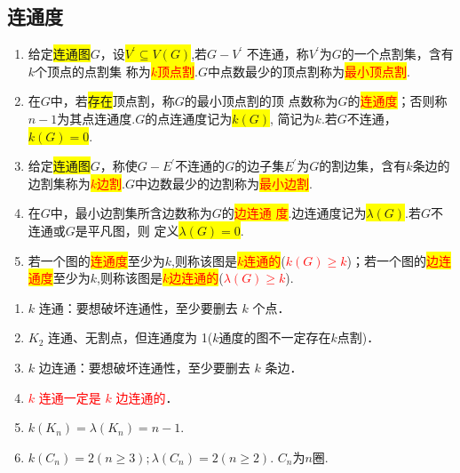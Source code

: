 \subsection{连通度}
\begin{definition}
	\begin{enumerate}
		\item 给定\colorbox{yellow}{连通图}$G$，设\colorbox{yellow}{$V^{'}\subseteq V(G)$},若$G -V^{'}$ 不连通，称$V^{'}$为$G$的一个点割集，含有$k$个顶点的点割集
		称为\colorbox{yellow}{\textcolor{red}{$k$顶点割}}.$G$中点数最少的顶点割称为\colorbox{yellow}{\textcolor{red}{最小顶点割}}.
		\item 在$G$中，若\colorbox{yellow}{存在}顶点割，称$G$的最小顶点割的顶
		点数称为$G$的\colorbox{yellow}{\textcolor{red}{连通度}}；否则称$n-1$为其点连通度.$G$的点连通度记为\colorbox{yellow}{$k(G)$}, 简记为$k$.若$G$不连通，\colorbox{yellow}{$k(G)=0$}.
		
		\item 给定\colorbox{yellow}{连通图}$G$，称使$G-E^{'}$不连通的$G$的边子集$E^{'}$为$G$的割边集，含有$k$条边的边割集称为\colorbox{yellow}{\textcolor{red}{$k$边割}}.$G$中边数最少的边割称为\colorbox{yellow}{\textcolor{red}{最小边割}}.
		\item 在$G$中，最小边割集所含边数称为$G$的\colorbox{yellow}{\textcolor{red}{边连通
		度}}.边连通度记为\colorbox{yellow}{$\lambda(G)$}.若$G$不连通或$G$是平凡图，则
		定义\colorbox{yellow}{$\lambda(G)=0$}.
		\item  若一个图的\colorbox{yellow}{\textcolor{red}{连通度}}至少为$k$,则称该图是\colorbox{yellow}{\textcolor{red}{$k$连通的}}(\textcolor{red}{$k(G)\geq k$})；若一个图的\colorbox{yellow}{\textcolor{red}{边连通度}}至少为$k$,则称该图是\colorbox{yellow}{\textcolor{red}{$k$边连通的}}(\textcolor{red}{$\lambda(G)\geq k$}).
\end{enumerate}
\end{definition}

\begin{note}
		\begin{enumerate}
		\item $k$ 连通：要想破坏连通性，至少要删去 $k$ 个点．
		\item $K_2$ 连通、无割点，但连通度为 1($k$通度的图不一定存在$k$点割)．
		\item $k$ 边连通：要想破坏连通性，至少要删去 $k$ 条边．
		\item \textcolor{red}{$k$ 连通一定是 $k$ 边连通的}．
		\item $k(K_n)=\lambda(K_n)=n-1$.
		\item $k(C_n)=2(n\geq 3); \lambda(C_n)=2(n\geq2)$. $C_n$为$n$圈.
	\end{enumerate}
\end{note}

